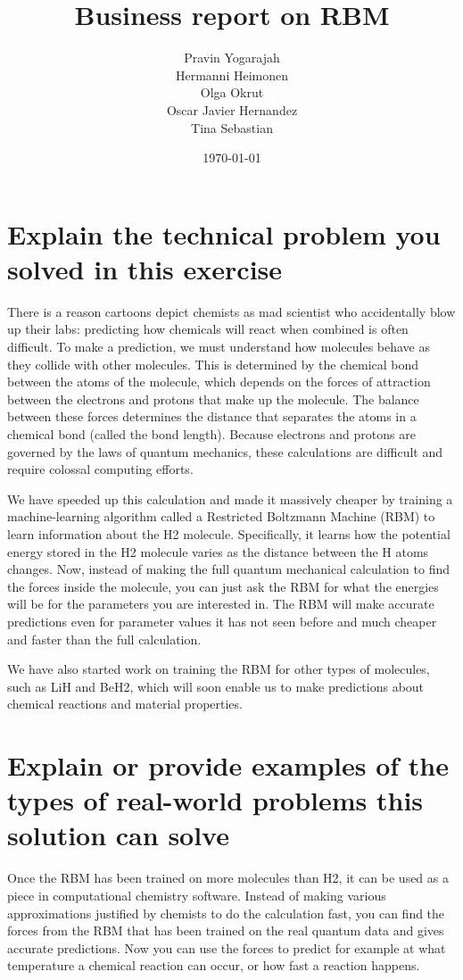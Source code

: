 \documentclass[a4paper]{article}
\title{Business report on RBM}
\author{Pravin Yogarajah\\
        Hermanni Heimonen\\
        Olga Okrut\\
        Oscar Javier Hernandez\\
        Tina Sebastian
}
\date{\today}
\begin{document}
\maketitle


\section{Explain the technical problem you solved in this exercise}
There is a reason cartoons depict chemists as mad scientist who accidentally blow up their labs: predicting how chemicals will react when combined is often difficult. To make a prediction, we must understand how molecules behave as they collide with other molecules. This is determined by the chemical bond between the atoms of the molecule, which depends on the forces of attraction between the electrons and protons that make up the molecule. The balance between these forces determines the distance that separates the atoms in a chemical bond (called the bond length). Because electrons and protons are governed by the laws of quantum mechanics, these calculations are difficult and require colossal computing efforts.

We have speeded up this calculation and made it massively cheaper by training a machine-learning algorithm called a Restricted Boltzmann Machine (RBM) to learn information about the H2 molecule. Specifically, it learns how the potential energy stored in the H2 molecule varies as the distance between the H atoms changes. Now, instead of making the full quantum mechanical calculation to find the forces inside the molecule, you can just ask the RBM for what the energies will be for the parameters you are interested in. The RBM will make accurate predictions even for parameter values it has not seen before and much cheaper and faster than the full calculation. 

We have also started work on training the RBM for other types of molecules, such as LiH and BeH2, which will soon enable us to make predictions about chemical reactions and material properties.


\section{Explain or provide examples of the types of real-world problems this solution can solve}

Once the RBM has been trained on more molecules than H2, it can be used as a piece in computational chemistry software. Instead of making various approximations justified by chemists to do the calculation fast, you can find the forces from the RBM that has been trained on the real quantum data and gives accurate predictions. Now you can use the forces to predict for example at what temperature a chemical reaction can occur, or how fast a reaction happens. 
\end{document}
